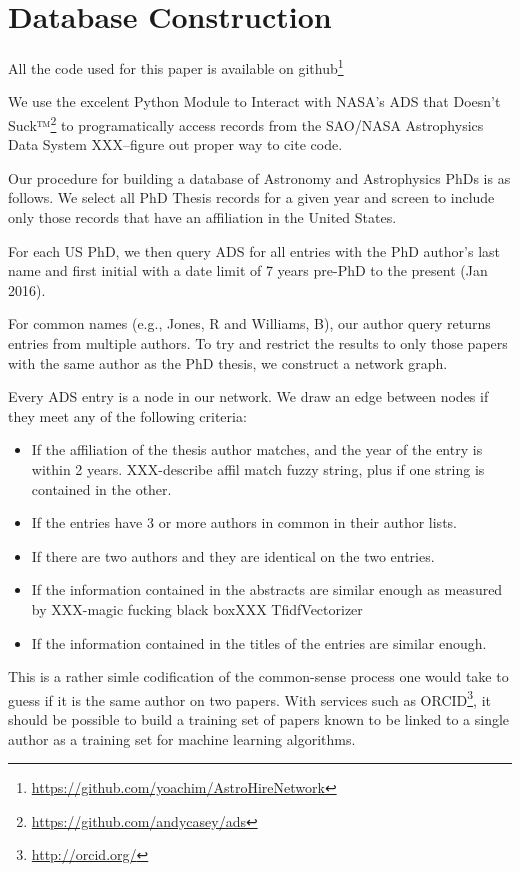 \documentclass{emulateapj}
\begin{document}
\section{Database Construction}

All the code used for this paper is available on github\footnote{\url{https://github.com/yoachim/AstroHireNetwork}}

We use the excelent Python Module to Interact with NASA's ADS that Doesn't Suck™\footnote{\url{https://github.com/andycasey/ads}} to programatically access records from the SAO/NASA Astrophysics Data System XXX--figure out proper way to cite code. 

Our procedure for building a database of Astronomy and Astrophysics PhDs is as follows.  We select all PhD Thesis records for a given year and screen to include only those records that have an affiliation in the United States.

For each US PhD, we then query ADS for all entries with the PhD author's last name and first initial with a date limit of 7 years pre-PhD to the present (Jan 2016).

For common names (e.g., Jones, R and Williams, B), our author query returns entries from multiple authors.  To try and restrict the results to only those papers with the same author as the PhD thesis, we construct a network graph.

Every ADS entry is a node in our network. We draw an edge between nodes if they meet any of the following criteria:
\begin{itemize}
\item{If the affiliation of the thesis author matches, and the year of the entry is within 2 years. XXX-describe affil match fuzzy string, plus if one string is contained in the other.}
\item{If the entries have 3 or more authors in common in their author lists.}
\item{If there are two authors and they are identical on the two entries.}
\item{If the information contained in the abstracts are similar enough as measured by XXX-magic fucking black boxXXX TfidfVectorizer}
  \item{If the information contained in the titles of the entries are similar enough.}
\end{itemize}

This is a rather simle codification of the common-sense process one would take to guess if it is the same author on two papers. With services such as ORCID\footnote{\url{http://orcid.org/}}, it should be possible to build a training set of papers known to be linked to a single author as a training set for machine learning algorithms.  
\end{document}
